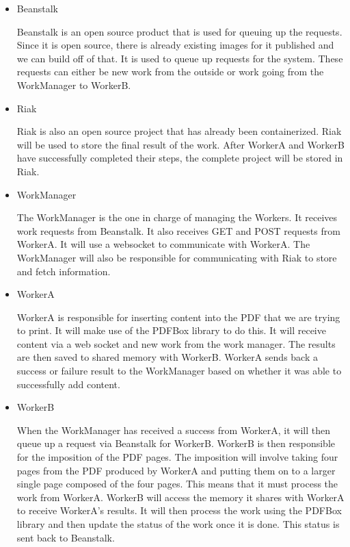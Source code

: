 \documentclass[onecolumn, draftclsnofoot,10pt, compsoc]{IEEEtran}
\begin{document}
\begin{itemize}
    \item Beanstalk
    
    Beanstalk is an open source product that is used for queuing up the requests.
    Since it is open source, there is already existing images for it published and we can build off of that.
    It is used to queue up requests for the system.
    These requests can either be new work from the outside or work going from the WorkManager to WorkerB.

    \item Riak
    
    Riak is also an open source project that has already been containerized. Riak will be used to store the final result of the work. After WorkerA and WorkerB have successfully completed their steps, the complete project will be stored in Riak.
    
    \item WorkManager
    
    The WorkManager is the one in charge of managing the Workers. It receives work requests from Beanstalk. It also receives GET and POST requests from WorkerA. It will use a websocket to communicate with WorkerA. The WorkManager will also be responsible for communicating with Riak to store and fetch information. 
    
    \item WorkerA
    
    WorkerA is responsible for inserting content into the PDF that we are trying to print. It will make use of the PDFBox library to do this. 
    It will receive content via a web socket and new work from the work manager. The results are then saved to shared memory with WorkerB. 
    WorkerA sends back a success or failure result to the WorkManager based on whether it was able to successfully add content. 
    
    \item WorkerB
    
    When the WorkManager has received a success from WorkerA, it will then queue up a request via Beanstalk for WorkerB. WorkerB is then responsible for the imposition of the PDF pages. The imposition will involve taking four pages from the PDF produced by WorkerA and putting them on to a larger single page composed of the four pages. This means that it must process the work from WorkerA. WorkerB will access the memory it shares with WorkerA to receive WorkerA’s results. It will then process the work using the PDFBox library and then update the status of the work once it is done. This status is sent back to Beanstalk.
    
    
\end{itemize}
\end{document}

